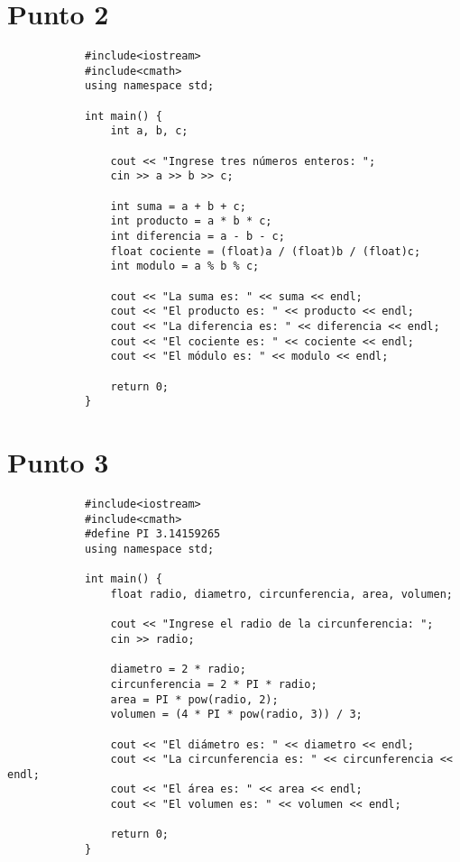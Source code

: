 \documentclass[10pt]{article}
\begin{document}
    \section*{Punto 2}
        \begin{verbatim}
            #include<iostream>
            #include<cmath>
            using namespace std;

            int main() {
                int a, b, c;

                cout << "Ingrese tres números enteros: ";
                cin >> a >> b >> c;

                int suma = a + b + c;
                int producto = a * b * c;
                int diferencia = a - b - c;
                float cociente = (float)a / (float)b / (float)c;
                int modulo = a % b % c;

                cout << "La suma es: " << suma << endl;
                cout << "El producto es: " << producto << endl;
                cout << "La diferencia es: " << diferencia << endl;
                cout << "El cociente es: " << cociente << endl;
                cout << "El módulo es: " << modulo << endl;

                return 0;
            }
        \end{verbatim}
        
    
    \section*{Punto 3}
        \begin{verbatim}
            #include<iostream>
            #include<cmath>
            #define PI 3.14159265
            using namespace std;
            
            int main() {
                float radio, diametro, circunferencia, area, volumen;
            
                cout << "Ingrese el radio de la circunferencia: ";
                cin >> radio;
            
                diametro = 2 * radio;
                circunferencia = 2 * PI * radio;
                area = PI * pow(radio, 2);
                volumen = (4 * PI * pow(radio, 3)) / 3;
            
                cout << "El diámetro es: " << diametro << endl;
                cout << "La circunferencia es: " << circunferencia << endl;
                cout << "El área es: " << area << endl;
                cout << "El volumen es: " << volumen << endl;
                
                return 0;
            }
        \end{verbatim}
    
\end{document}
